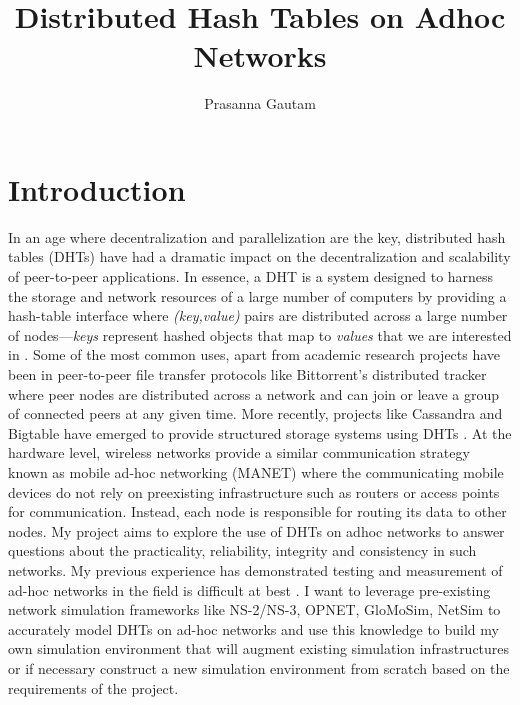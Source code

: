 \documentclass[a4paper,10pt]{article}
\newcommand{\cmt}[2]{#2}
\begin{document}
\title{Distributed Hash Tables on Adhoc Networks}
\author{Prasanna Gautam}

\maketitle
{}
\section*{Introduction}
In an age where decentralization and parallelization are the key, distributed hash tables (DHTs) \cmt{have had revolutionary effects}{have had a dramatic impact on the decentralization and scalability of peer-to-peer applications}. In essence, a DHT is a system designed to harness the storage and network resources of \cmt{large}{a large} number of computers by providing a hash-table interface \cmt{where the}{where} \emph{(key,value)} pairs are \cmt{stored}{distributed} across \cmt{various}{a large number of} nodes\cmt{ where}{---}\emph{keys} \cmt{are}{represent} hashe\cmt{s}{d} \cmt{of the objects}{objects} \cmt{or}{that map to} \emph{values} \cmt{stored in the system}{that we are interested in} \cite{Naor07novelarchitectures}. Some of the most common uses, apart from academic research projects have been in peer-to-peer file transfer protocols like Bittorrent's distributed tracker where \cmt{}{peer} nodes \cmt{can be}{are} distributed \cmt{anywhere in the internet}{across a network} and can \cmt{drop in and out of connection}{join or leave a group of connected peers at any given time}. More recently, projects like Cassandra\cmt{,}{ and} Bigtable have emerged to provide structured storage systems using DHTs \cite{Chang06bigtable:a}\cite{Lakshman_cassandra-a}. \cmt{A parallel in the}{At the hardware level,} wireless networks \cmt{of this type of}{provide a similar} communication \cmt{is mobile}{strategy known as mobile} ad-hoc networking (MANET) where the communicating \cmt{nodes}{mobile devices} do not rely on preexisting infrastructure\cmt{s}{} such as routers or access points \cmt{to communicate with each other}{for communication}. Instead, each node \cmt{routes by forwarding data}{is responsible for routing its data} to other nodes. My project aims to explore the use of DHTs on adhoc networks to answer questions about the practicality, reliability, integrity and consistency in such networks. \cmt{From experience I konw that}{My previous experience has demonstrated} testing and measur\cmt{ing}{ement of} ad\cmt{}{-}hoc \cmt{}{networks} in the field is difficult at best \cmt{and in many cases impossible}\cmt{ so }{.  }I want to leverage \cmt{the }{pre-}existing network simulation frameworks like NS-2/NS-3, OPNET, GloMoSim, NetSim to accurately model DHTs on ad-hoc networks and \cmt{creating}{use this knowledge to build} my own simulation environment that will augment \cmt{the}{} existing simulation infrastructure\cmt{}{s} or if ne\cmt{eded}{cessary}\cmt{, be entirely new based}{ construct a new simulation environment from scratch based} on the requirements of the project.
\end{document}
